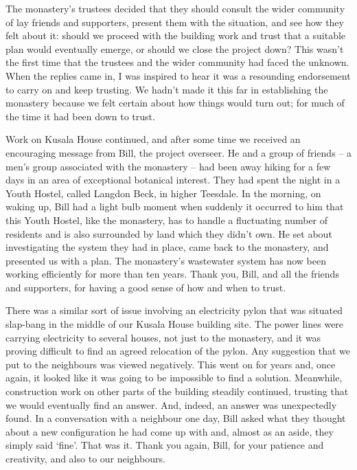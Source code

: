 The monastery's trustees decided that they should consult the wider
community of lay friends and supporters, present them with the
situation, and see how they felt about it: should we proceed with the
building work and trust that a suitable plan would eventually emerge, or
should we close the project down? This wasn't the first time that the
trustees and the wider community had faced the unknown. When the replies
came in, I was inspired to hear it was a resounding endorsement to
carry on and keep trusting. We hadn't made it this far in establishing
the monastery because we felt certain about how things would turn out;
for much of the time it had been down to trust.

Work on Kusala House continued, and after some time we received an
encouraging message from Bill, the project overseer. He and a group of
friends -- a men's group associated with the monastery -- had been away
hiking for a few days in an area of exceptional botanical interest. They
had spent the night in a Youth Hostel, called Langdon Beck\cite{langdon},
in higher Teesdale. In the morning, on waking up, Bill
had a light bulb moment when suddenly it occurred to him that this Youth
Hostel, like the monastery, has to handle a fluctuating number of
residents and is also surrounded by land which they didn't own. He set
about investigating the system they had in place, came back to the
monastery, and presented us with a plan. The monastery's wastewater
system has now been working efficiently for more than ten years. Thank
you, Bill, and all the friends and supporters, for having a good sense
of how and when to trust.

There was a similar sort of issue involving an electricity pylon that
was situated slap-bang in the middle of our Kusala House building site.
The power lines were carrying electricity to several houses, not just to
the monastery, and it was proving difficult to find an agreed relocation
of the pylon. Any suggestion that we put to the neighbours was viewed
negatively. This went on for years and, once again, it looked like it
was going to be impossible to find a solution. Meanwhile, construction
work on other parts of the building steadily continued, trusting that we
would eventually find an answer. And, indeed, an answer was unexpectedly
found. In a conversation with a neighbour one day, Bill asked what they
thought about a new configuration he had come up with and, almost as an
aside, they simply said `fine'. That was it. Thank you again, Bill, for
your patience and creativity, and also to our neighbours.

